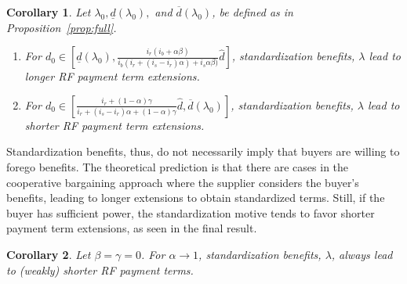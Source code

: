 \documentclass[a4paper,11pt]{article}
\newcommand{\dref}{\widehat d}
\renewcommand{\~}[1]{\tilde{#1}}
\renewcommand{\-}[1]{\overline{#1}}
\newtheorem{corollary}{Corollary}
\newcounter{pretheorem}
\renewcommand\thehypothesis{\arabic{pretheorem}\alph{hypothesis}}
\begin{document}
\begin{corollary}\singlespacing\label{cor:standardization}
    Let $\lambda_0,\underline{d}\left(\lambda_0\right),$ and $\overline{d}\left(\lambda_0\right)$,  be defined as in Proposition~\ref{prop:full}.
    \begin{enumerate}[label=(\roman*)]
         \item For $d_0\in\left[\underline{d}\left(\lambda_0\right),\frac{ i_r (i_b + \alpha \beta)}{
  i_b (i_r + \left(i_s- i_r\right) \alpha) + i_s \alpha \beta)}\dref\right]$, standardization benefits, $\lambda$ lead to longer RF payment term extensions.
         \item For $d_0\in\left[\frac{ i_r + \left(1- \alpha\right) \gamma}{i_r + (i_s-i_r) \alpha + (1-\alpha)\gamma}\dref,\overline{d}\left(\lambda_0\right)\right]$, standardization benefits, $\lambda$ lead to shorter RF payment term extensions.
     \end{enumerate}
\end{corollary}

Standardization benefits, thus, do not necessarily imply that buyers are willing to forego benefits. The theoretical prediction is that there are cases in the cooperative bargaining approach where the supplier considers the buyer's benefits, leading to longer extensions to obtain standardized terms. Still, if the buyer has sufficient power, the standardization motive tends to favor shorter payment term extensions, as seen in the final result.
\begin{corollary}\label{cor:alpha:limit}
    Let $\beta=\gamma=0$. For $ \alpha\rightarrow 1$, standardization benefits, $\lambda$, always lead to (weakly) shorter RF payment terms.
\end{corollary}

\renewcommand\thehypothesis{\arabic{pretheorem}}
\end{document}
